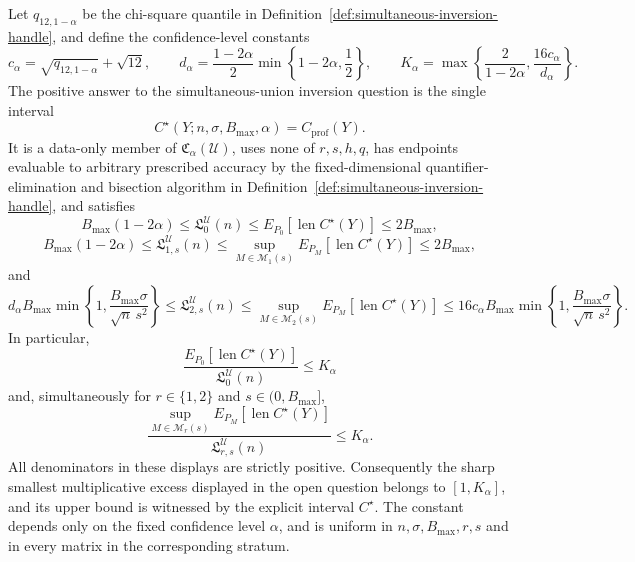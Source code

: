 Let \(q_{12,1-\alpha}\) be the chi-square quantile in Definition~\ref{def:simultaneous-inversion-handle}, and define the confidence-level constants
\[
 c_\alpha=\sqrt{q_{12,1-\alpha}}+\sqrt{12},\qquad
 d_\alpha=\frac{1-2\alpha}{2}\min\left\{1-2\alpha,\frac12\right\},
 \qquad
 K_\alpha=\max\left\{\frac{2}{1-2\alpha},\frac{16c_\alpha}{d_\alpha}\right\}.
\]
The positive answer to the simultaneous-union inversion question is the single interval
\[
 C^\star(Y;n,\sigma,B_{\max},\alpha)=C_{\mathrm{prof}}(Y).
\]
It is a data-only member of \(\mathfrak C_\alpha(\mathcal U)\), uses none of \(r,s,h,q\), has endpoints evaluable to arbitrary prescribed accuracy by the fixed-dimensional quantifier-elimination and bisection algorithm in Definition~\ref{def:simultaneous-inversion-handle}, and satisfies
\[
 B_{\max}(1-2\alpha)\leq\mathfrak L_0^{\mathcal U}(n)
 \leq E_{P_0}[\operatorname{len}C^\star(Y)]\leq2B_{\max},
\]
\[
 B_{\max}(1-2\alpha)\leq\mathfrak L_{1,s}^{\mathcal U}(n)
 \leq\sup_{M\in\mathcal M_1(s)}E_{P_M}[\operatorname{len}C^\star(Y)]
 \leq2B_{\max},
\]
and
\[
 d_\alpha B_{\max}\min\left\{1,\frac{B_{\max}\sigma}{\sqrt n\,s^2}\right\}
 \leq\mathfrak L_{2,s}^{\mathcal U}(n)
 \leq\sup_{M\in\mathcal M_2(s)}E_{P_M}[\operatorname{len}C^\star(Y)]
 \leq16c_\alpha B_{\max}\min\left\{1,\frac{B_{\max}\sigma}{\sqrt n\,s^2}\right\}.
\]
In particular,
\[
 \frac{E_{P_0}[\operatorname{len}C^\star(Y)]}{\mathfrak L_0^{\mathcal U}(n)}\leq K_\alpha
\]
and, simultaneously for \(r\in\{1,2\}\) and \(s\in(0,B_{\max}]\),
\[
 \frac{\sup_{M\in\mathcal M_r(s)}E_{P_M}[\operatorname{len}C^\star(Y)]}
 {\mathfrak L_{r,s}^{\mathcal U}(n)}\leq K_\alpha.
\]
All denominators in these displays are strictly positive.  Consequently the sharp smallest multiplicative excess displayed in the open question belongs to \([1,K_\alpha]\), and its upper bound is witnessed by the explicit interval \(C^\star\).  The constant depends only on the fixed confidence level \(\alpha\), and is uniform in \(n,\sigma,B_{\max},r,s\) and in every matrix in the corresponding stratum.